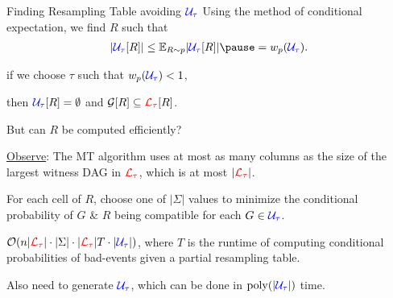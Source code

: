\documentclass{beamer}
\def\padding{\vspace{0.5cm}}
\def\spadding{\vspace{0.25cm}}
\begin{document}
\begin{frame}{Finding Resampling Table avoiding $\textcolor{blue}{\mathcal{U}_\tau}$}
Using the method of conditional expectation, we find $R$ such that \vspace{-0.5em}\begin{align*}
    |\compat{\U}{R}| \leq \E[R \sim \law]{|\compat{\U}{R}|} \pause = \w(\U).
\end{align*}\pause

\vspace{-1.8em}\follows if we choose $\tau$ such that $w_p(\textcolor{blue}{\mathcal{U}_\tau}) < 1$,\par then $\textcolor{blue}{\mathcal{U}_\tau}[R] = \emptyset$ and $\mathcal{G}[R] \subseteq \textcolor{red}{\mathcal{L}_\tau}[R]$.\pause\padding

But can $R$ be computed efficiently?\pause\spadding

\underline{Observe}: The MT algorithm uses at most as many columns as the size of the largest witness DAG in $\textcolor{red}{\mathcal{L}_\tau}$\pause, which is at most $|\textcolor{red}{\mathcal{L}_\tau}|$.\pause\spadding

For each cell of $R$, choose one of $|\Sigma|$ values to minimize the conditional probability of $G$ \& $R$ being compatible for each $G \in \textcolor{blue}{\mathcal{U}_\tau}$.\pause\spadding

\follows $\mathcal{O}(n |\textcolor{red}{\mathcal{L}_\tau}| \cdot |\Sigma| \cdot |\textcolor{red}{\mathcal{L}_\tau}| T \cdot |\textcolor{blue}{\mathcal{U}_\tau}|)$\pause, where $T$ is the runtime of computing conditional probabilities of bad-events given a partial resampling table.\pause\par
Also need to generate $\textcolor{blue}{\mathcal{U}_\tau}$, which can be done in $\mathrm{poly}(|\textcolor{blue}{\mathcal{U}_\tau}|)$ time.
\end{frame}
\end{document}
